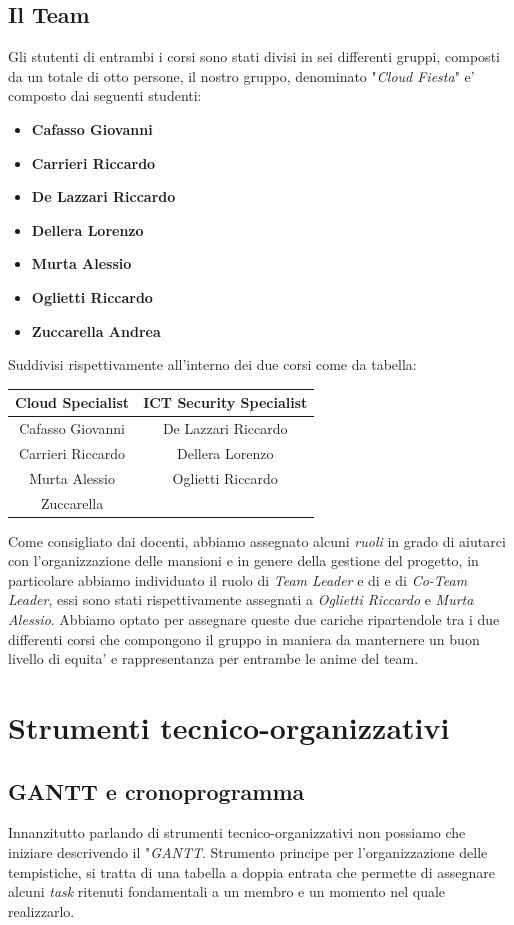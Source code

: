 \documentclass[a4paper]{report}
\begin{document}
	\section{Il Team}
	Gli stutenti di entrambi i corsi sono stati divisi in sei differenti gruppi, composti da un totale di otto persone,
	il nostro gruppo, denominato "\emph{Cloud Fiesta}" e' composto dai seguenti studenti:
	\begin{itemize}
		\item \textbf{Cafasso Giovanni}
		\item \textbf{Carrieri Riccardo}
		\item \textbf{De Lazzari Riccardo}
		\item \textbf{Dellera Lorenzo}
		\item \textbf{Murta Alessio}
		\item \textbf{Oglietti Riccardo}
		\item \textbf{Zuccarella Andrea}
	\end{itemize}
	Suddivisi rispettivamente all'interno dei due corsi come da tabella:
	\begin{center}
		\begin{tabular}{c|c}
			Cloud Specialist & ICT Security Specialist \\
			\hline
			Cafasso Giovanni & De Lazzari Riccardo \\
			Carrieri Riccardo & Dellera Lorenzo \\
			Murta Alessio & Oglietti Riccardo \\
			Zuccarella & \\
		\end{tabular}
	\end{center}
	Come consigliato dai docenti, abbiamo assegnato alcuni \emph{ruoli} in grado di aiutarci con l'organizzazione delle
	mansioni e in genere della gestione del progetto, in particolare abbiamo individuato il ruolo di \emph{Team Leader}
	e di e di \emph{Co-Team Leader}, essi sono stati rispettivamente assegnati a \emph{Oglietti Riccardo} e \emph{Murta
	Alessio}. Abbiamo optato per assegnare queste due cariche ripartendole tra i due differenti corsi che compongono il
	gruppo in maniera da manternere un buon livello di equita' e rappresentanza per entrambe le anime del team.

\chapter{Strumenti tecnico-organizzativi}
\author{Oglietti Riccardo}
	\section{GANTT e cronoprogramma}
	Innanzitutto parlando di strumenti tecnico-organizzativi non possiamo che iniziare descrivendo il "\emph{GANTT}.
	Strumento principe per l'organizzazione delle tempistiche, si tratta di una tabella a doppia entrata che permette di
	assegnare alcuni \emph{task} ritenuti fondamentali a un membro e un momento nel quale realizzarlo.
\end{document}
